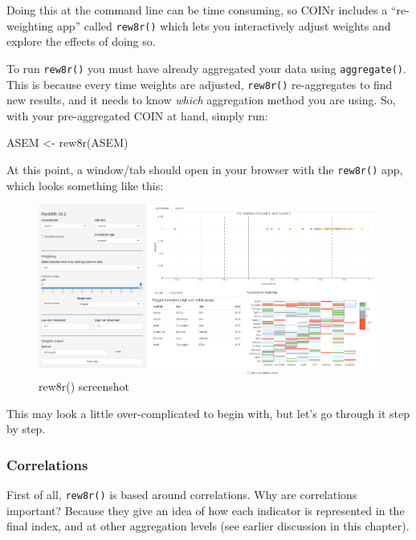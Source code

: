 \documentclass[
]{book}
\newenvironment{Shaded}{\begin{snugshade}}{\end{snugshade}}
\newcommand{\FunctionTok}[1]{\textcolor[rgb]{0.00,0.00,0.00}{#1}}
\newcommand{\NormalTok}[1]{#1}
\newcommand{\OtherTok}[1]{\textcolor[rgb]{0.56,0.35,0.01}{#1}}
\begin{document}
Doing this at the command line can be time consuming, so COINr includes a ``re-weighting app'' called \texttt{rew8r()} which lets you interactively adjust weights and explore the effects of doing so.

To run \texttt{rew8r()} you must have already aggregated your data using \texttt{aggregate()}. This is because every time weights are adjusted, \texttt{rew8r()} re-aggregates to find new results, and it needs to know \emph{which} aggregation method you are using. So, with your pre-aggregated COIN at hand, simply run:

\begin{Shaded}
\begin{Highlighting}[]
\NormalTok{ASEM }\OtherTok{\textless{}{-}} \FunctionTok{rew8r}\NormalTok{(ASEM)}
\end{Highlighting}
\end{Shaded}

At this point, a window/tab should open in your browser with the \texttt{rew8r()} app, which looks something like this:

\begin{figure}

{\centering \includegraphics[width=1\linewidth]{images/rew8r_screenshot} 

}

\caption{rew8r() screenshot}\label{fig:unnamed-chunk-45}
\end{figure}

This may look a little over-complicated to begin with, but let's go through it step by step.

\hypertarget{correlations}{%
\subsubsection{Correlations}\label{correlations}}

First of all, \texttt{rew8r()} is based around correlations. Why are correlations important? Because they give an idea of how each indicator is represented in the final index, and at other aggregation levels (see earlier discussion in this chapter).
\end{document}
